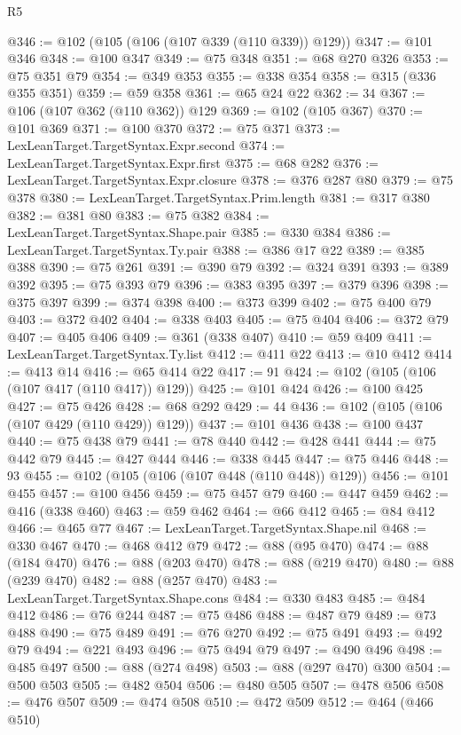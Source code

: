 \begin{lexlean}{R5}
\begin{coremodule}
@346 := @102 (@105 (@106 (@107 @339 (@110 @339)) @129))
@347 := @101 @346
@348 := @100 @347
@349 := @75 @348
@351 := @68 @270 @326
@353 := @75 @351 @79
@354 := @349 @353
@355 := @338 @354
@358 := @315 (@336 @355 @351)
@359 := @59 @358
@361 := @65 @24 @22
@362 := 34
@367 := @106 (@107 @362 (@110 @362)) @129
@369 := @102 (@105 @367)
@370 := @101 @369
@371 := @100 @370
@372 := @75 @371
@373 := LexLeanTarget.TargetSyntax.Expr.second
@374 := LexLeanTarget.TargetSyntax.Expr.first
@375 := @68 @282
@376 := LexLeanTarget.TargetSyntax.Expr.closure
@378 := @376 @287 @80
@379 := @75 @378
@380 := LexLeanTarget.TargetSyntax.Prim.length
@381 := @317 @380
@382 := @381 @80
@383 := @75 @382
@384 := LexLeanTarget.TargetSyntax.Shape.pair
@385 := @330 @384
@386 := LexLeanTarget.TargetSyntax.Ty.pair
@388 := @386 @17 @22
@389 := @385 @388
@390 := @75 @261
@391 := @390 @79
@392 := @324 @391
@393 := @389 @392
@395 := @75 @393 @79
@396 := @383 @395
@397 := @379 @396
@398 := @375 @397
@399 := @374 @398
@400 := @373 @399
@402 := @75 @400 @79
@403 := @372 @402
@404 := @338 @403
@405 := @75 @404
@406 := @372 @79
@407 := @405 @406
@409 := @361 (@338 @407)
@410 := @59 @409
@411 := LexLeanTarget.TargetSyntax.Ty.list
@412 := @411 @22
@413 := @10 @412
@414 := @413 @14
@416 := @65 @414 @22
@417 := 91
@424 := @102 (@105 (@106 (@107 @417 (@110 @417)) @129))
@425 := @101 @424
@426 := @100 @425
@427 := @75 @426
@428 := @68 @292
@429 := 44
@436 := @102 (@105 (@106 (@107 @429 (@110 @429)) @129))
@437 := @101 @436
@438 := @100 @437
@440 := @75 @438 @79
@441 := @78 @440
@442 := @428 @441
@444 := @75 @442 @79
@445 := @427 @444
@446 := @338 @445
@447 := @75 @446
@448 := 93
@455 := @102 (@105 (@106 (@107 @448 (@110 @448)) @129))
@456 := @101 @455
@457 := @100 @456
@459 := @75 @457 @79
@460 := @447 @459
@462 := @416 (@338 @460)
@463 := @59 @462
@464 := @66 @412
@465 := @84 @412
@466 := @465 @77
@467 := LexLeanTarget.TargetSyntax.Shape.nil
@468 := @330 @467
@470 := @468 @412 @79
@472 := @88 (@95 @470)
@474 := @88 (@184 @470)
@476 := @88 (@203 @470)
@478 := @88 (@219 @470)
@480 := @88 (@239 @470)
@482 := @88 (@257 @470)
@483 := LexLeanTarget.TargetSyntax.Shape.cons
@484 := @330 @483
@485 := @484 @412
@486 := @76 @244
@487 := @75 @486
@488 := @487 @79
@489 := @73 @488
@490 := @75 @489
@491 := @76 @270
@492 := @75 @491
@493 := @492 @79
@494 := @221 @493
@496 := @75 @494 @79
@497 := @490 @496
@498 := @485 @497
@500 := @88 (@274 @498)
@503 := @88 (@297 @470) @300
@504 := @500 @503
@505 := @482 @504
@506 := @480 @505
@507 := @478 @506
@508 := @476 @507
@509 := @474 @508
@510 := @472 @509
@512 := @464 (@466 @510)

\end{coremodule}
\end{lexlean}
